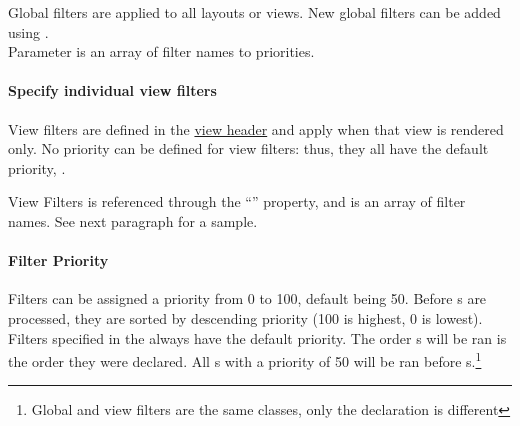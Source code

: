 \documentclass[pdftex,12pt,a4paper]{article}
\begin{document}
Global filters are applied to all layouts or views. New global filters can be added using .\\
Parameter is an array of filter names to priorities.

\paragraph{Specify individual view filters}

View filters are defined in the \hyperref[sec:view-header]{view header} and apply when that view is rendered only. No priority can be defined for view filters: thus, they all have the default priority, .

View Filters is referenced through the ``''  property, and is an array of filter names. See next paragraph for a sample.

\paragraph{Filter Priority}
Filters can be assigned a priority from 0 to 100, default being 50. Before s are processed, they are sorted by descending priority (100 is highest, 0 is lowest).
Filters specified in the  always have the default priority. The order s will be ran is the order they were declared. All s with a priority of 50 will be ran before s.\footnote{Global and view filters are the same classes, only the declaration is different}
\end{document}
